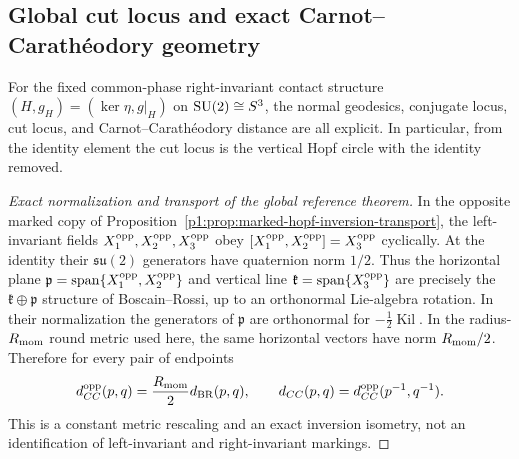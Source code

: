 \documentclass[11pt]{article}
\begin{document}
\subsection{Global cut locus and exact Carnot--Carath\'eodory geometry}
\label{p1:subsec:cc-global}

\begin{theorem}
\label{p1:thm:marked-cc-global}
For the fixed common-phase right-invariant contact structure
\((H,g_H)=(\ker\eta,g|_H)\) on \(\mathrm{SU}(2)\cong S^3\), the normal geodesics,
conjugate locus, cut locus, and Carnot--Carath\'eodory distance are all explicit.
In particular, from the identity element the cut locus is the vertical Hopf circle with the identity removed.
\end{theorem}

\begin{proof}[Exact normalization and transport of the global reference theorem]
In the opposite marked copy of Proposition~\ref{p1:prop:marked-hopf-inversion-transport},
the left-invariant fields $X^{\rm opp}_1,X^{\rm opp}_2,X^{\rm opp}_3$ obey
$[X^{\rm opp}_1,X^{\rm opp}_2]=X^{\rm opp}_3$ cyclically.  At the
identity their $\mathfrak{su}(2)$ generators have quaternion norm $1/2$.
Thus the horizontal plane $\mathfrak p=\operatorname{span}
\{X^{\rm opp}_1,X^{\rm opp}_2\}$ and vertical line
$\mathfrak k=\operatorname{span}\{X^{\rm opp}_3\}$ are precisely the
$\mathfrak k\oplus\mathfrak p$ structure of Boscain--Rossi, up to an
orthonormal Lie-algebra rotation.  In their normalization the generators
of $\mathfrak p$ are orthonormal for $-\tfrac12\operatorname{Kil}$.
In the radius-$R_{\mathrm{mom}}$ round metric used here, the same horizontal vectors
have norm $R_{\mathrm{mom}}/2$.  Therefore for every pair of endpoints
\[
 d_{CC}^{\rm opp}(p,q)={R_{\mathrm{mom}}\over2}
             d_{\rm BR}(p,q),\qquad
 d_{CC}(p,q)=d_{CC}^{\rm opp}(p^{-1},q^{-1}).
\]
This is a constant metric rescaling and an exact inversion isometry,
not an identification of left-invariant and right-invariant markings.


\end{proof}
\end{document}
